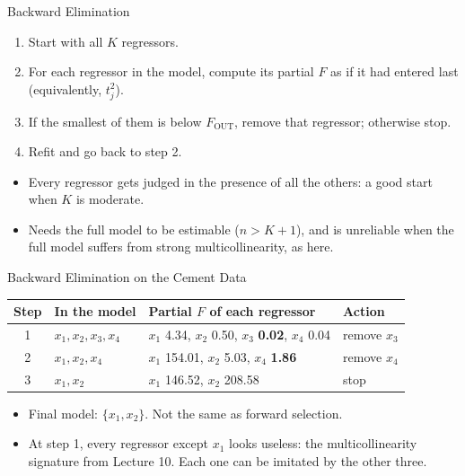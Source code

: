 \begin{frame}{Backward Elimination}
    \begin{enumerate}
        \item Start with all $K$ regressors.
        \item For each regressor in the model, compute its partial $F$ as if it had entered last (equivalently, $t_j^2$).
        \item If the smallest of them is below $F_{\text{OUT}}$, remove that regressor; otherwise stop.
        \item Refit and go back to step 2.
    \end{enumerate}
    \svspace{0.5em}
    \begin{itemize}
        \item Every regressor gets judged in the presence of all the others: a good start when $K$ is moderate.
        \item Needs the full model to be estimable ($n>K+1$), and is unreliable when the full model suffers from strong multicollinearity, as here.
    \end{itemize}
\end{frame}


\begin{frame}{Backward Elimination on the Cement Data}
    \begin{center}
        \small
        \begin{tabular}{clll}
            \toprule
            Step & In the model & Partial $F$ of each regressor & Action \\
            \midrule
            1 & $x_1,x_2,x_3,x_4$ & $x_1$ 4.34, $x_2$ 0.50, $x_3$ \textbf{0.02}, $x_4$ 0.04 & remove $x_3$ \\
            2 & $x_1,x_2,x_4$ & $x_1$ 154.01, $x_2$ 5.03, $x_4$ \textbf{1.86} & remove $x_4$ \\
            3 & $x_1,x_2$ & $x_1$ 146.52, $x_2$ 208.58 & stop \\
            \bottomrule
        \end{tabular}
    \end{center}
    \begin{itemize}
        \item Final model: $\{x_1,x_2\}$. Not the same as forward selection.
        \item At step 1, every regressor except $x_1$ looks useless: the multicollinearity signature from Lecture 10. Each one can be imitated by the other three.
    \end{itemize}
\end{frame}


